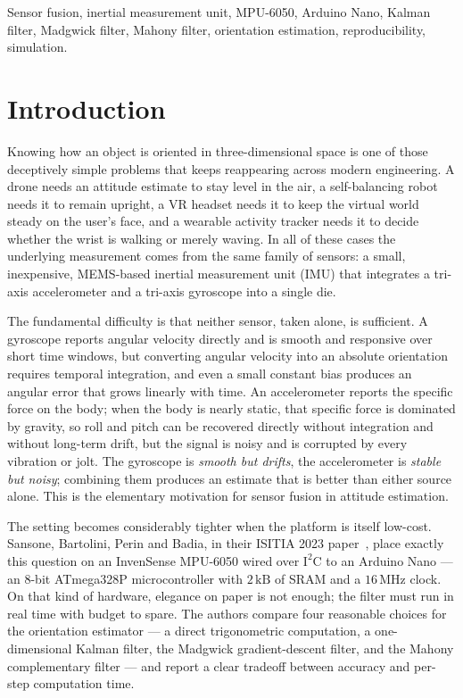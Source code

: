 \documentclass[conference]{IEEEtran}
\begin{document}
\begin{IEEEkeywords}
Sensor fusion, inertial measurement unit, MPU-6050, Arduino Nano,
Kalman filter, Madgwick filter, Mahony filter, orientation
estimation, reproducibility, simulation.
\end{IEEEkeywords}

\section{Introduction}\label{sec:intro}

Knowing how an object is oriented in three-dimensional space is one
of those deceptively simple problems that keeps reappearing across
modern engineering. A drone needs an attitude estimate to stay level
in the air, a self-balancing robot needs it to remain upright, a VR
headset needs it to keep the virtual world steady on the user's
face, and a wearable activity tracker needs it to decide whether
the wrist is walking or merely waving. In all of these cases the
underlying measurement comes from the same family of sensors: a
small, inexpensive, MEMS-based inertial measurement unit (IMU)
that integrates a tri-axis accelerometer and a tri-axis gyroscope
into a single die.

The fundamental difficulty is that neither sensor, taken alone, is
sufficient. A gyroscope reports angular velocity directly and is
smooth and responsive over short time windows, but converting
angular velocity into an absolute orientation requires temporal
integration, and even a small constant bias produces an angular
error that grows linearly with time. An accelerometer reports the
specific force on the body; when the body is nearly static, that
specific force is dominated by gravity, so roll and pitch can be
recovered directly without integration and without long-term
drift, but the signal is noisy and is corrupted by every vibration
or jolt. The gyroscope is \emph{smooth but drifts}, the
accelerometer is \emph{stable but noisy}; combining them produces
an estimate that is better than either source alone. This is the
elementary motivation for sensor fusion in attitude estimation.

The setting becomes considerably tighter when the platform is
itself low-cost. Sansone, Bartolini, Perin and Badia,
in their ISITIA 2023 paper~\cite{badia2023}, place exactly this
question on an InvenSense MPU-6050 wired over $\mathrm{I}^2\mathrm{C}$ to an Arduino
Nano --- an 8-bit ATmega328P microcontroller with $2\,\mathrm{kB}$
of SRAM and a $16\,\mathrm{MHz}$ clock. On that kind of hardware,
elegance on paper is not enough; the filter must run in real time
with budget to spare. The authors compare four reasonable choices
for the orientation estimator --- a direct trigonometric
computation, a one-dimensional Kalman filter, the Madgwick
gradient-descent filter, and the Mahony complementary filter ---
and report a clear tradeoff between accuracy and per-step
computation time.
\end{document}

